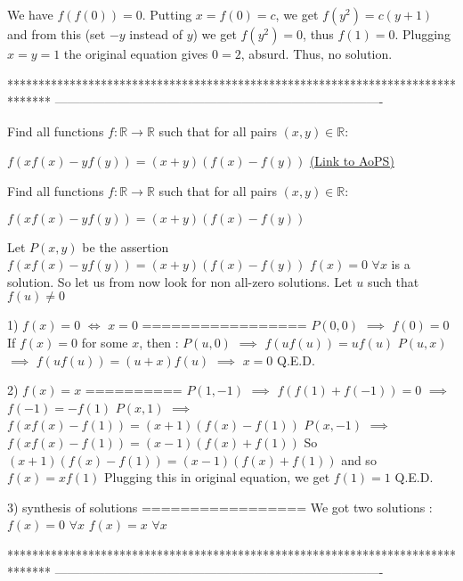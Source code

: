 \begin{solution}
	We have $f(f(0))=0$. Putting $x=f(0)=c$, we get $f(y^2)=c(y+1)$ and from this (set $-y$ instead of $y$) we get $f(y^2)=0$, thus $f(1)=0$. Plugging $x=y=1$ the original equation gives $0=2$, absurd. Thus, no solution.
\end{solution}
*******************************************************************************
-------------------------------------------------------------------------------

\begin{problem}
	Find all functions $f:\mathbb{R} \to \mathbb{R}$ such that for all pairs $(x,y) \in \mathbb{R}$:

$f(xf(x)-yf(y))=(x+y)(f(x)-f(y))$
	\flushright \href{https://artofproblemsolving.com/community/c6h459129}{(Link to AoPS)}
\end{problem}



\begin{solution}
	\begin{tcolorbox}Find all functions $f:\mathbb{R} \to \mathbb{R}$ such that for all pairs $(x,y) \in \mathbb{R}$:

$f(xf(x)-yf(y))=(x+y)(f(x)-f(y))$\end{tcolorbox}
Let $P(x,y)$ be the assertion $f(xf(x)-yf(y))=(x+y)(f(x)-f(y))$
$f(x)=0$ $\forall x$ is a solution. So let us from now look for non all-zero solutions.
Let $u$ such that $f(u)\ne 0$

1) $f(x)=0$ $\iff$ $x=0$
=================
$P(0,0)$ $\implies$ $f(0)=0$
If $f(x)=0$ for some $x$, then :
$P(u,0)$ $\implies$ $f(uf(u))=uf(u)$
$P(u,x)$ $\implies$ $f(uf(u))=(u+x)f(u)$ $\implies$ $x=0$
Q.E.D.

2) $f(x)=x$
==========
$P(1,-1)$ $\implies$ $f(f(1)+f(-1))=0$ $\implies$ $f(-1)=-f(1)$
$P(x,1)$ $\implies$ $f(xf(x)-f(1))=(x+1)(f(x)-f(1))$
$P(x,-1)$ $\implies$ $f(xf(x)-f(1))=(x-1)(f(x)+f(1))$
So $(x+1)(f(x)-f(1))=(x-1)(f(x)+f(1))$ and so $f(x)=xf(1)$
Plugging this in original equation, we get $f(1)=1$
Q.E.D.

3) synthesis of solutions
=================
We got two solutions :
$f(x)=0$ $\forall x$
$f(x)=x$ $\forall x$
\end{solution}
*******************************************************************************
-------------------------------------------------------------------------------

